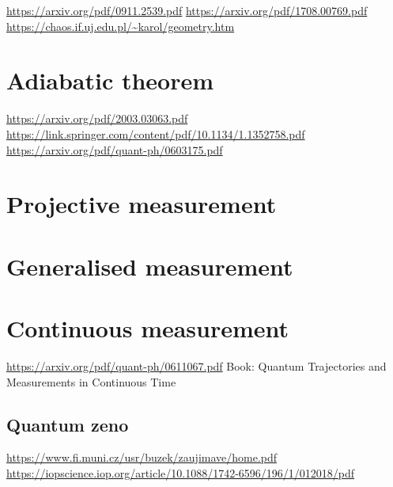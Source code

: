 \url{https://arxiv.org/pdf/0911.2539.pdf}
\url{https://arxiv.org/pdf/1708.00769.pdf}
\url{https://chaos.if.uj.edu.pl/~karol/geometry.htm}

\section{Adiabatic theorem}
\url{https://arxiv.org/pdf/2003.03063.pdf}
\url{https://link.springer.com/content/pdf/10.1134/1.1352758.pdf}
\url{https://arxiv.org/pdf/quant-ph/0603175.pdf}

\section{Projective measurement}

\section{Generalised measurement}

\section{Continuous measurement}
\url{https://arxiv.org/pdf/quant-ph/0611067.pdf}
Book: Quantum Trajectories and Measurements in Continuous Time

\subsection{Quantum zeno}
\url{https://www.fi.muni.cz/usr/buzek/zaujimave/home.pdf}
\url{https://iopscience.iop.org/article/10.1088/1742-6596/196/1/012018/pdf}